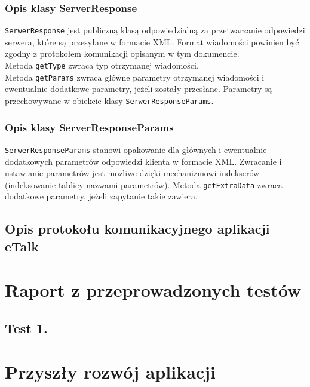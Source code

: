 \documentclass[a4paper,12pt]{article}
\begin{document}
\subsubsection[Opis klasy ServerResponse]{Opis klasy ServerResponse}
\texttt{SerwerResponse} jest publiczną klasą odpowiedzialną za przetwarzanie odpowiedzi serwera, które są przesyłane w formacie XML.
Format wiadomości powinien być zgodny z protokołem komunikacji opisanym w tym dokumencie.\\
Metoda \texttt{getType} zwraca typ otrzymanej wiadomości.\\
Metoda \texttt{getParams} zwraca główne parametry otrzymanej wiadomości i ewentualnie dodatkowe parametry, jeżeli zostały przesłane. Parametry są przechowywane w obiekcie klasy \texttt{SerwerResponseParams}.

\subsubsection[Opis klasy ServerResponseParams]{Opis klasy ServerResponseParams}
\texttt{SerwerResponseParams} stanowi opakowanie dla głównych i ewentualnie dodatkowych parametrów odpowiedzi klienta w formacie XML. Zwracanie i ustawianie parametrów jest możliwe dzięki mechanizmowi indekserów (indeksowanie tablicy nazwami parametrów).
Metoda \texttt{getExtraData} zwraca dodatkowe parametry, jeżeli zapytanie takie zawiera.

\subsection[Opis protokołu komunikacyjnego aplikacji eTalk]{Opis protokołu komunikacyjnego aplikacji eTalk}

\section[Raport z przeprowadzonych testów]{Raport z przeprowadzonych testów}
\subsection[Test 1.]{Test 1.}


\section[Przyszły rozwój aplikacji]{Przyszły rozwój aplikacji}
\end{document}
